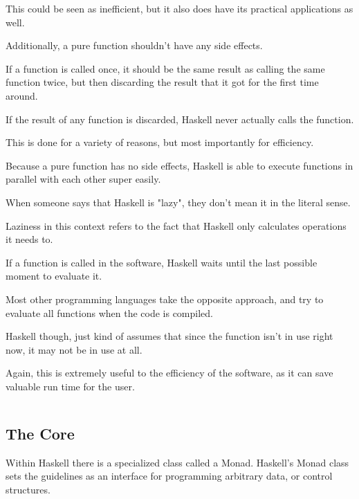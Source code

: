 \documentclass{article}
\begin{document}
\medskip\noindent
This could be seen as inefficient, but it also does have its practical applications as well.

\medskip\noindent
Additionally, a pure function shouldn't have any side effects.

\medskip\noindent
If a function is called once, it should be the same result as calling the same function twice, but then discarding the result that it got for the first time around.

\medskip\noindent
If the result of any function is discarded, Haskell never actually calls the function.

\medskip\noindent
This is done for a variety of reasons, but most importantly for efficiency.

\medskip\noindent
Because a pure function has no side effects, Haskell is able to execute functions in parallel with each other super easily.

\medskip\noindent
When someone says that Haskell is "lazy", they don't mean it in the literal sense.

\medskip\noindent
Laziness in this context refers to the fact that Haskell only calculates operations it needs to.

\medskip\noindent
If a function is called in the software, Haskell waits until the last possible moment to evaluate it.

\medskip\noindent
Most other programming languages take the opposite approach, and try to evaluate all functions when the code is compiled.

\medskip\noindent
Haskell though, just kind of assumes that since the function isn't in use right now, it may not be in use at all.

\medskip\noindent
Again, this is extremely useful to the efficiency of the software, as it can save valuable run time for the user.

\medskip\noindent
 

\medskip\medskip
\begin{lstlisting}
\end{lstlisting}

\medskip

\subsection{The Core}
\medskip\medskip
\hspace{\parindent} 

Within Haskell there is a specialized class called a Monad. Haskell's Monad class sets the guidelines as an interface for programming arbitrary data, or control structures. 
\end{document}
